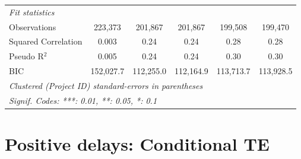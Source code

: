 \documentclass[
]{article}
\begin{document}
\begin{table}[htbp]
\begin{tabular}{lccccc}
      \midrule
      \emph{Fit statistics}\\
      Observations                 & 223,373       & 201,867       & 201,867       & 199,508       & 199,470\\  
      Squared Correlation          & 0.003         & 0.24          & 0.24          & 0.28          & 0.28\\  
      Pseudo R$^2$                 & 0.005         & 0.24          & 0.24          & 0.30          & 0.30\\  
      BIC                          & 152,027.7     & 112,255.0     & 112,164.9     & 113,713.7     & 113,928.5\\  
      \midrule \midrule
      \multicolumn{6}{l}{\emph{Clustered (Project ID) standard-errors in parentheses}}\\
      \multicolumn{6}{l}{\emph{Signif. Codes: ***: 0.01, **: 0.05, *: 0.1}}\\
   \end{tabular}
\end{table}

\hypertarget{positive-delays-conditional-te}{%
\section{Positive delays: Conditional
TE}\label{positive-delays-conditional-te}}
\end{document}
